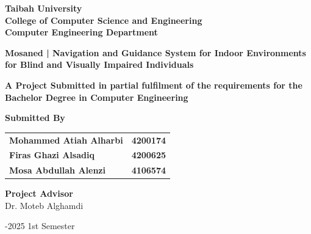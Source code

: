 \begin{titlepage}
    {\titlefont \textbf{Taibah University}}\\
    {\titlefont \textbf{College of Computer Science and Engineering}}\\
    {\titlefont \textbf{Computer Engineering Department}}\\
    
    \vspace{1.8cm}
    
    {\titlefont \textbf{Mosaned | Navigation and Guidance System for Indoor Environments for Blind and Visually Impaired Individuals }}
    
    \vspace{1.8cm}

    {\titlefont \fontsize{14}{16} \textbf{A Project Submitted in partial fulfilment of the requirements for the Bachelor Degree in Computer Engineering}}
    \vspace{1.8cm}
    
    \vspace{1.2cm}
    
    \begin{minipage}{\textwidth}
    	\centering
    	{\titlefont \textbf{Submitted By}}\\
    	\vspace{1cm}
    	
    	\begin{tabular}{@{}l@{\hskip 4cm}r@{}}
    		{\titlefont \textbf{Mohammed Atiah Alharbi}} & {\titlefont \textbf{4200174}} \\
    		{\titlefont \textbf{Firas Ghazi Alsadiq}} & {\titlefont \textbf{4200625}} \\
    		{\titlefont \textbf{Mosa Abdullah Alenzi}} & {\titlefont \textbf{4106574}} \\
    	\end{tabular}
    \end{minipage}
    
    \vspace{1.8cm}

    {\selectfont\fontsize{14}{16}\normalfont
    \textbf{Project Advisor}\\
    Dr. Moteb Alghamdi
    }
    
    \vspace{2cm}

    {\selectfont\fontsize{14}{16}-2025  1st Semester
    }

\end{titlepage}
